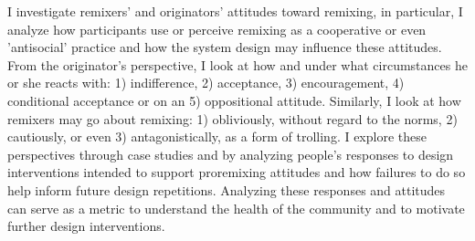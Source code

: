 I investigate remixers' and originators' attitudes toward remixing, in particular, I analyze how participants use or perceive remixing as a cooperative or even 'antisocial' practice and how the system design may influence these attitudes. From the originator's perspective, I look at how and under what circumstances he or she reacts with: 
1) indifference, 
2) acceptance, 
3) encouragement, 
4) conditional acceptance or on an 
5) oppositional attitude. 
Similarly, I look at how remixers may go about remixing: 
1) obliviously, without regard to the norms, 
2) cautiously, or even 
3) antagonistically, as a form of trolling.
I explore these perspectives through case studies and by analyzing people's responses to design interventions intended to support proremixing attitudes and how failures to do so help inform future design repetitions. Analyzing these responses and attitudes can serve as a metric to understand the health of the community and to motivate further design interventions.


